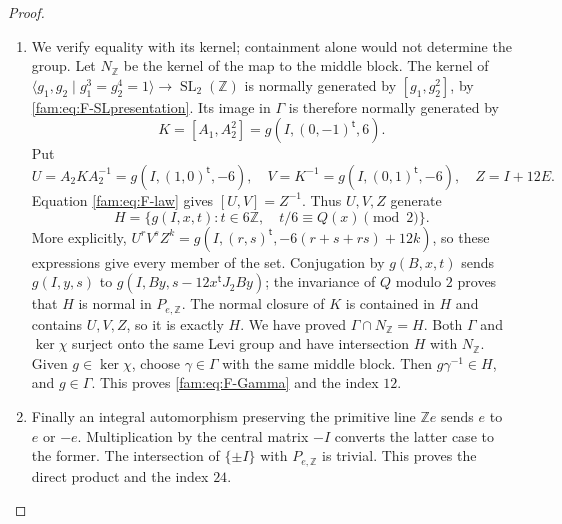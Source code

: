 \begin{proof}
\begin{enumerate}[label=\arabic*.,leftmargin=*]
\item We verify equality with its kernel; containment alone would not determine
the group.  Let $N_{\mathbb Z}$ be the kernel of the map to the middle
block.  The kernel of
$\langle g_1,g_2\mid g_1^3=g_2^4=1\rangle\to
\operatorname{SL}_2(\mathbb Z)$ is normally generated by
$[g_1,g_2^2]$, by \eqref{fam:eq:F-SLpresentation}.  Its image in $\Gamma$ is
therefore normally generated by
\[
 K=[A_1,A_2^2]=g(I,(0,-1)^{\mathsf t},6).
\]
Put
\[
 U=A_2KA_2^{-1}=g(I,(1,0)^{\mathsf t},-6),\quad
 V=K^{-1}=g(I,(0,1)^{\mathsf t},-6),\quad Z=I+12E.
\]
Equation \eqref{fam:eq:F-law} gives $[U,V]=Z^{-1}$.  Thus $U,V,Z$ generate
\begin{equation}\label{fam:eq:F-H}
 H=\{g(I,x,t):t\in6\mathbb Z,\quad t/6\equiv Q(x)\pmod2\}.
\end{equation}
More explicitly,
$U^rV^sZ^k=g(I,(r,s)^{\mathsf t},-6(r+s+rs)+12k)$, so these expressions
give every member of the set.  Conjugation by $g(B,x,t)$ sends
$g(I,y,s)$ to $g(I,By,s-12x^{\mathsf t}J_2By)$; the invariance of $Q$
modulo $2$ proves that $H$ is normal in $P_{e,\mathbb Z}$.  The normal
closure of $K$ is contained in $H$ and contains $U,V,Z$, so it is exactly
$H$.  We have proved $\Gamma\cap N_{\mathbb Z}=H$.  Both $\Gamma$ and
$\ker\chi$ surject onto the same Levi group and have intersection $H$
with $N_{\mathbb Z}$.  Given $g\in\ker\chi$, choose $\gamma\in\Gamma$
with the same middle block.  Then $g\gamma^{-1}\in H$, and $g\in\Gamma$.
This proves \eqref{fam:eq:F-Gamma} and the index $12$.

\item Finally an integral automorphism preserving the primitive line
$\mathbb Ze$ sends $e$ to $e$ or $-e$.  Multiplication by the central
matrix $-I$ converts the latter case to the former.  The intersection of
$\{\pm I\}$ with $P_{e,\mathbb Z}$ is trivial.  This proves the direct
product and the index $24$.
\end{enumerate}
\end{proof}

